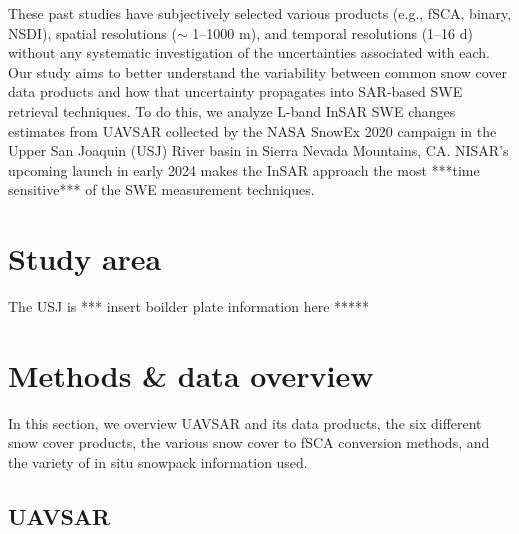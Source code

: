 These past studies have subjectively selected various products (e.g., fSCA, binary, NSDI), spatial resolutions ($\sim$ 1--1000 m), and temporal resolutions (1--16 d) without any systematic investigation of the uncertainties associated with each. Our study aims to better understand the variability between common snow cover data products and how that uncertainty propagates into SAR-based SWE retrieval techniques. To do this, we analyze L-band InSAR SWE changes estimates from UAVSAR collected by the NASA SnowEx 2020 \cite{marshallNASASnowEx20202019} campaign in the Upper San Joaquin (USJ) River basin in Sierra Nevada Mountains, CA. NISAR's upcoming launch in early 2024 makes the InSAR approach the most ***time sensitive*** of the SWE measurement techniques.



\hypertarget{ch4-methods}{\section{Study area}\label{ch4-methods}}

The USJ is *** insert boilder plate information here *****

\hypertarget{ch4-methods}{\section{Methods \& data overview}\label{ch4-methods}}
In this section, we overview UAVSAR and its data products, the six different snow cover products, the various snow cover to fSCA conversion methods, and the variety of in situ snowpack information used.

\hypertarget{ch4-methods-1}{\subsection{UAVSAR}\label{ch4-methods-1}}

